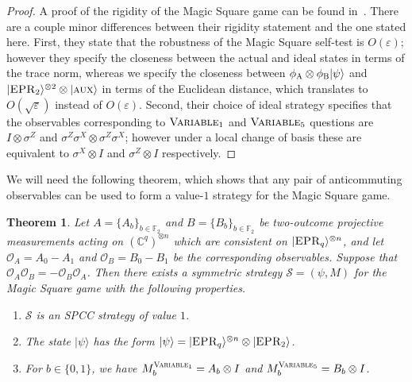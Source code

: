 \documentclass[11pt]{article}
\newtheorem{theorem}{Theorem}[section]
\theoremstyle{definition}
\newcommand{\ket}[1]{|#1\rangle}
\newcommand{\C}{\ensuremath{\mathbb{C}}}
\newcommand{\F}{\ensuremath{\mathbb{F}}}
\newcommand{\eps}{\varepsilon}
\newcommand{\strategy}{\mathscr{S}}
\newcommand{\labelstyle}[1]{\ensuremath{\textsc{#1}}\xspace}
\newcommand{\EPR}{\labelstyle{EPR}}
\newcommand{\aux}{\labelstyle{aux}}
\newcommand{\alice}{\labelstyle{A}}
\newcommand{\bob}{\labelstyle{B}}
\newcommand{\typestyle}[1]{\ensuremath{\textsc{#1}}\xspace}
\newcommand{\Variable}{\typestyle{Variable}}
\begin{document}
\begin{proof}
 	A proof of the rigidity of the Magic Square game can be found in~\cite[Theorem 6.9]{coladangelo2017robust}. There are a couple minor differences between their rigidity statement and the one stated here. First, they state that the robustness of the Magic Square self-test is $O(\eps)$; however they specify the closeness between the actual and ideal states in terms of the trace norm, whereas we specify the closeness between $\phi_\alice \otimes \phi_\bob \ket{\psi}$ and $\ket{\EPR_2}^{\otimes 2}\otimes \ket{\aux}$ in terms of the Euclidean distance, which translates to $O(\sqrt{\eps})$ instead of $O(\eps)$. Second, their choice of ideal strategy specifies that the observables corresponding to $\Variable_1$ and $\Variable_5$ questions are $I \otimes \sigma^Z$ and $\sigma^{Z} \sigma^{X} \otimes \sigma^Z \sigma^X$; however under a local change of basis these are equivalent to $\sigma^X \otimes I$ and $\sigma^Z \otimes I$ respectively.
\end{proof}

We will need the following theorem,
which shows that any pair of anticommuting observables 
can be used to form a value-$1$ strategy for the Magic Square game.

\begin{theorem}
  \label{thm:ms-from-ac}
  Let $A = \{A_b\}_{b \in \F_2}$ and $B = \{B_b\}_{b \in \F_2}$ be two-outcome
  projective measurements acting on $(\C^q)^{\otimes n}$ which are consistent on
  $\ket{\EPR_q}^{\otimes n}$, and let $\mathcal{O}_A = A_0 - A_1$ and
  $\mathcal{O}_B = B_0 - B_1$ be the corresponding observables.
  Suppose that $\mathcal{O}_A \mathcal{O}_B = -\mathcal{O}_B \mathcal{O}_A$.
  Then there exists a symmetric strategy $\strategy = (\psi, M)$ for the Magic
  Square game with the following properties.
  \begin{enumerate}
  \item $\strategy$ is an SPCC strategy of value $1$.
  \item The state $\ket{\psi}$ has the form $\ket{\psi} = \ket{\EPR_q}^{\otimes
      n} \otimes \ket{\EPR_2}$.
  \item For $b \in \{0,1\}$, we have $M^{\Variable_1}_b = A_b \otimes I$ and
    $M^{\Variable_5}_b = B_b \otimes I$.\label{item:embeds}
  \end{enumerate}
\end{theorem}
\end{document}
